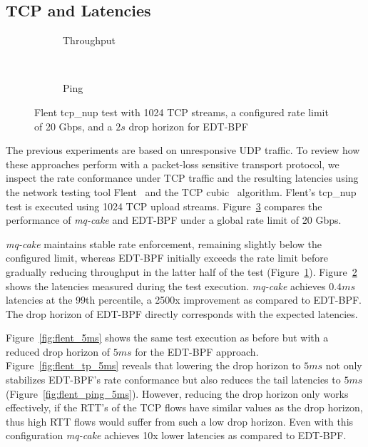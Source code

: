 \subsection{TCP and Latencies}
\begin{figure}[t]
    \centering
    \hspace{-0.25cm}
    \begin{subfigure}{\linewidth}
        \centering
        
        \caption{Throughput}\label{fig:flent_tp_2s}
    \end{subfigure}
    \\
    \begin{subfigure}{\linewidth}
        \centering
        
        \caption{Ping}\label{fig:flent_ping_2s}
    \end{subfigure}
    \caption{Flent tcp\_nup test with 1024 TCP streams, a configured rate limit of 20 Gbps, and a $2s$ drop horizon for EDT-BPF}\label{fig:flent_2s}
\end{figure}

The previous experiments are based on unresponsive UDP traffic.
To review how these approaches perform with a packet-loss sensitive transport protocol, we inspect the rate conformance under TCP traffic and the resulting latencies using the network testing tool Flent~\cite{flent} and the TCP cubic~\cite{tcp-cubic} algorithm.
%
Flent's tcp\_nup test is executed using 1024 TCP upload streams.
%
Figure~\ref{fig:flent_2s} compares the performance of \textit{mq-cake} and EDT-BPF under a global rate limit of 20 Gbps.

\textit{mq-cake} maintains stable rate enforcement, remaining slightly below the configured limit, whereas EDT-BPF initially exceeds the rate limit before gradually reducing throughput in the latter half of the test (Figure~\ref{fig:flent_tp_2s}).
%
Figure~\ref{fig:flent_ping_2s} shows the latencies measured during the test execution. \textit{mq-cake} achieves $0.4 ms$ latencies at the 99th percentile, a 2500x improvement as compared to EDT-BPF.
%
The drop horizon of EDT-BPF directly corresponds with the expected latencies.
%

Figure~\ref{fig:flent_5ms} shows the same test execution as before but with a reduced drop horizon of $5ms$ for the EDT-BPF approach. Figure~\ref{fig:flent_tp_5ms} reveals that lowering the drop horizon to $5ms$ not only stabilizes EDT-BPF's rate conformance but also reduces the tail latencies to $5ms$ (Figure~\ref{fig:flent_ping_5ms}).
%
However, reducing the drop horizon only works effectively, if the RTT's of the TCP flows have similar values as the drop horizon, thus high RTT flows would suffer from such a low drop horizon.
Even with this configuration \textit{mq-cake} achieves 10x lower latencies as compared to EDT-BPF. 

